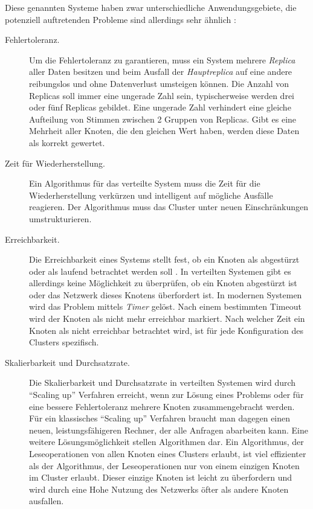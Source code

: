 Diese genannten Systeme haben zwar unterschiedliche Anwendungsgebiete, die potenziell auftretenden Probleme sind allerdings sehr ähnlich \cite{Buyya08cloudcomputing}:

\begin{description} 
	\item[Fehlertoleranz.] Um die Fehlertoleranz zu garantieren, muss ein System mehrere \textit{Replica} aller Daten besitzen und beim Ausfall der \textit{Hauptreplica} auf eine andere reibungslos und ohne Datenverlust umsteigen können. Die Anzahl von Replicas soll immer eine ungerade Zahl sein, typischerweise werden drei oder fünf Replicas gebildet. Eine ungerade Zahl verhindert eine gleiche Aufteilung von Stimmen zwischen 2 Gruppen von Replicas. Gibt es eine Mehrheit aller Knoten, die den gleichen Wert haben, werden diese Daten als korrekt gewertet.
	
	\item[Zeit für Wiederherstellung.] Ein Algorithmus für das verteilte System muss die Zeit für die Wiederherstellung verkürzen und intelligent auf mögliche Ausfälle reagieren. Der Algorithmus muss das Cluster unter neuen Einschränkungen umstrukturieren.
	
	\item[Erreichbarkeit.] Die Erreichbarkeit eines Systems stellt fest, ob ein Knoten als abgestürzt oder als laufend betrachtet werden soll \cite{Armbrust10aview}. In verteilten Systemen gibt es allerdings keine Möglichkeit zu überprüfen, ob ein Knoten abgestürzt ist oder das Netzwerk dieses Knotens überfordert ist. In modernen Systemen wird das Problem mittels \textit{Timer} gelöst. Nach einem bestimmten Timeout wird der Knoten als nicht mehr erreichbar markiert. Nach welcher Zeit ein Knoten als nicht erreichbar betrachtet wird, ist für jede Konfiguration des Clusters spezifisch.
	
	\item[Skalierbarkeit und Durchsatzrate.] Die Skalierbarkeit und Durchsatzrate in verteilten Systemen wird durch “Scaling up” Verfahren erreicht, wenn zur Lösung eines Problems oder für eine bessere Fehlertoleranz mehrere Knoten zusammengebracht werden. Für ein klassisches “Scaling up” Verfahren braucht man dagegen einen neuen, leistungsfähigeren Rechner, der alle Anfragen abarbeiten kann. Eine weitere Lösungsmöglichkeit stellen Algorithmen dar. Ein Algorithmus, der Leseoperationen von allen Knoten eines Clusters erlaubt, ist viel effizienter als der Algorithmus, der Leseoperationen nur von einem einzigen Knoten im Cluster erlaubt. Dieser einzige Knoten ist leicht zu überfordern und wird durch eine Hohe Nutzung des Netzwerks öfter als andere Knoten ausfallen.
	

\end{description}
